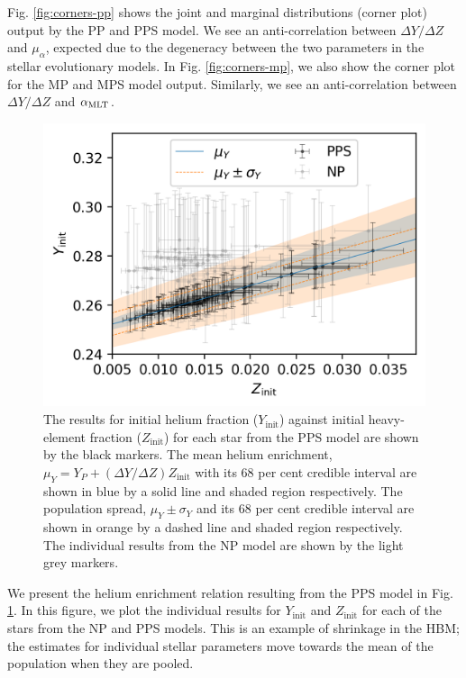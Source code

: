 Fig. \ref{fig:corners-pp} shows the joint and marginal distributions (corner plot) output by the PP and PPS model. We see an anti-correlation between $\Delta Y / \Delta Z$ and $\mu_\alpha$, expected due to the degeneracy between the two parameters in the stellar evolutionary models. In Fig. \ref{fig:corners-mp}, we also show the corner plot for the MP and MPS model output. Similarly, we see an anti-correlation between $\Delta Y / \Delta Z$ and ${\alpha_\mathrm{MLT}}$.

\begin{figure}[tb]
    \centering
    \includegraphics{figures/zi_yi_results_plot.png}
    \caption[The results for initial helium fraction against initial heavy-element fraction for each star from the PPS model.]{The results for initial helium fraction ($Y_\mathrm{init}$) against initial heavy-element fraction ($Z_\mathrm{init}$) for each star from the PPS model are shown by the black markers. The mean helium enrichment, $\mu_Y = Y_P + (\Delta Y / \Delta Z) Z_\mathrm{init}$ with its 68 per cent credible interval are shown in blue by a solid line and shaded region respectively. The population spread, $\mu_Y \pm \sigma_Y$ and its 68 per cent credible interval are shown in orange by a dashed line and shaded region respectively. The individual results from the NP model are shown by the light grey markers.}
    \label{fig:helium}
\end{figure}

We present the helium enrichment relation resulting from the PPS model in Fig. \ref{fig:helium}. In this figure, we plot the individual results for $Y_\mathrm{init}$ and $Z_\mathrm{init}$ for each of the stars from the NP and PPS models. This is an example of shrinkage in the HBM; the estimates for individual stellar parameters move towards the mean of the population when they are pooled.

